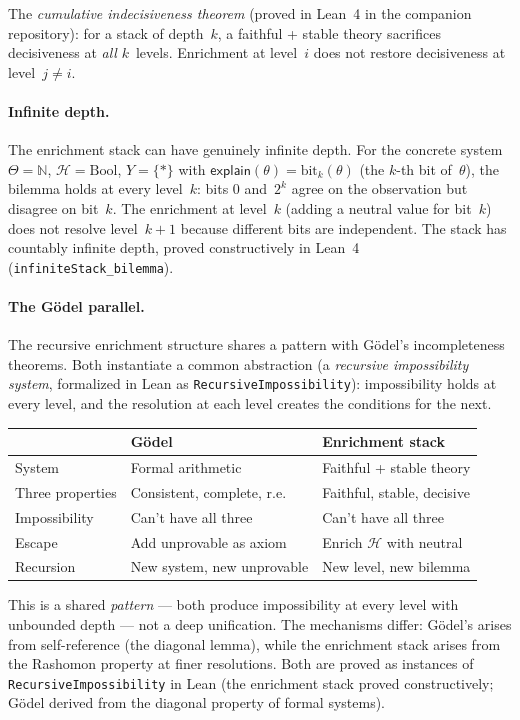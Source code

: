 \documentclass[11pt,a4paper]{article}
\newcommand{\sH}{\mathcal{H}}
\begin{document}
The \emph{cumulative indecisiveness theorem} (proved in Lean~4 in the companion repository): for a stack of depth~$k$, a faithful + stable theory sacrifices decisiveness at \emph{all} $k$~levels. Enrichment at level~$i$ does not restore decisiveness at level~$j \neq i$.

\paragraph{Infinite depth.}
The enrichment stack can have genuinely infinite depth. For the concrete system $\Theta = \mathbb{N}$, $\sH = \text{Bool}$, $Y = \{*\}$ with $\mathsf{explain}(\theta) = \text{bit}_k(\theta)$ (the $k$-th bit of~$\theta$), the bilemma holds at every level~$k$: bits 0 and~$2^k$ agree on the observation but disagree on bit~$k$. The enrichment at level~$k$ (adding a neutral value for bit~$k$) does not resolve level~$k+1$ because different bits are independent. The stack has countably infinite depth, proved constructively in Lean~4 (\texttt{infiniteStack\_bilemma}).

\paragraph{The Gödel parallel.}
The recursive enrichment structure shares a pattern with Gödel's incompleteness theorems. Both instantiate a common abstraction (a \emph{recursive impossibility system}, formalized in Lean as \texttt{RecursiveImpossibility}): impossibility holds at every level, and the resolution at each level creates the conditions for the next.

\begin{center}
\begin{tabular}{@{}lll@{}}
\toprule
 & \textbf{Gödel} & \textbf{Enrichment stack} \\
\midrule
System & Formal arithmetic & Faithful + stable theory \\
Three properties & Consistent, complete, r.e. & Faithful, stable, decisive \\
Impossibility & Can't have all three & Can't have all three \\
Escape & Add unprovable as axiom & Enrich $\sH$ with neutral \\
Recursion & New system, new unprovable & New level, new bilemma \\
\bottomrule
\end{tabular}
\end{center}

This is a shared \emph{pattern} --- both produce impossibility at every level with unbounded depth --- not a deep unification. The mechanisms differ: Gödel's arises from self-reference (the diagonal lemma), while the enrichment stack arises from the Rashomon property at finer resolutions. Both are proved as instances of \texttt{RecursiveImpossibility} in Lean (the enrichment stack proved constructively; Gödel derived from the diagonal property of formal systems).
\end{document}
